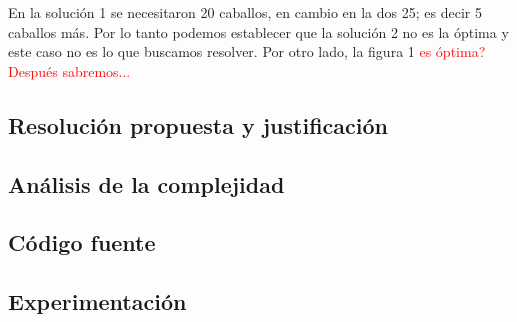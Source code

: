 \documentclass[a4paper]{article}
\begin{document}
En la soluci\'on 1 se necesitaron 20 caballos, en cambio en la dos 25; es decir 5 caballos m\'as. Por lo tanto podemos establecer que la soluci\'on 2 no es la \'optima y este caso no es lo que buscamos resolver. Por otro lado, la figura 1 \textcolor{red}{es \'optima? Despu\'es sabremos...}

\subsection{Resoluci\'on propuesta y justificaci\'on}


\subsection{An\'alisis de la complejidad}
\subsection{C\'odigo fuente}
\subsection{Experimentaci\'on}













\end{document}
